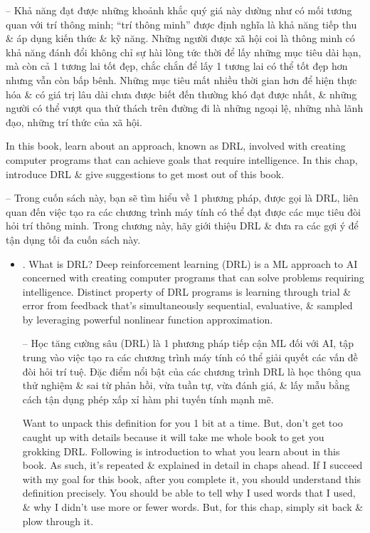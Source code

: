 \documentclass{article}
\begin{document}
\begin{itemize}
    -- Khả năng đạt được những khoảnh khắc quý giá này dường như có mối tương quan với trí thông minh; ``trí thông minh'' được định nghĩa là khả năng tiếp thu \& áp dụng kiến thức \& kỹ năng. Những người được xã hội coi là thông minh có khả năng đánh đổi không chỉ sự hài lòng tức thời để lấy những mục tiêu dài hạn, mà còn cả 1 tương lai tốt đẹp, chắc chắn để lấy 1 tương lai có thể tốt đẹp hơn nhưng vẫn còn bấp bênh. Những mục tiêu mất nhiều thời gian hơn để hiện thực hóa \& có giá trị lâu dài chưa được biết đến thường khó đạt được nhất, \& những người có thể vượt qua thử thách trên đường đi là những ngoại lệ, những nhà lãnh đạo, những trí thức của xã hội.

    In this book, learn about an approach, known as DRL, involved with creating computer programs that can achieve goals that require intelligence. In this chap, introduce DRL \& give suggestions to get most out of this book.

    -- Trong cuốn sách này, bạn sẽ tìm hiểu về 1 phương pháp, được gọi là DRL, liên quan đến việc tạo ra các chương trình máy tính có thể đạt được các mục tiêu đòi hỏi trí thông minh. Trong chương này, hãy giới thiệu DRL \& đưa ra các gợi ý để tận dụng tối đa cuốn sách này.
    \begin{itemize}
        \item {. What is DRL?} Deep reinforcement learning (DRL) is a ML approach to AI concerned with creating computer programs that can solve problems requiring intelligence. Distinct property of DRL programs is learning through trial \& error from feedback that's simultaneously sequential, evaluative, \& sampled by leveraging powerful nonlinear function approximation.

        -- Học tăng cường sâu (DRL) là 1 phương pháp tiếp cận ML đối với AI, tập trung vào việc tạo ra các chương trình máy tính có thể giải quyết các vấn đề đòi hỏi trí tuệ. Đặc điểm nổi bật của các chương trình DRL là học thông qua thử nghiệm \& sai từ phản hồi, vừa tuần tự, vừa đánh giá, \& lấy mẫu bằng cách tận dụng phép xấp xỉ hàm phi tuyến tính mạnh mẽ.

        Want to unpack this definition for you 1 bit at a time. But, don't get too caught up with details because it will take me whole book to get you grokking DRL. Following is introduction to what you learn about in this book. As such, it's repeated \& explained in detail in chaps ahead. If I succeed with my goal for this book, after you complete it, you should understand this definition precisely. You should be able to tell why I used words that I used, \& why I didn't use more or fewer words. But, for this chap, simply sit back \& plow through it.


\end{itemize}
\end{itemize}
\end{document}
